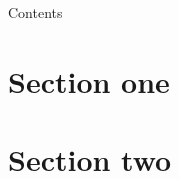 \documentclass{beamer}
\begin{document}
\begin{frame}
  \titlepage
\end{frame}

\begin{frame}{Contents}
  \tableofcontents
\end{frame}

\section{Section one}%
\label{sec:section_1}


\section{Section two}%

\label{sec:section_2}
\end{document}
